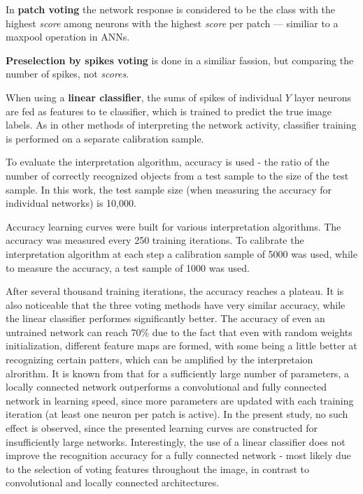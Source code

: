 \documentclass[a4paper]{article}
\begin{document}
In \textbf{patch voting} the network response is considered to be the class with the highest \textit{score} among neurons with the highest \textit{score} per patch --- similiar to a maxpool operation in ANNs.

\textbf{Preselection by spikes voting} is done in a similiar fassion, but comparing the number of spikes, not \textit{scores}.

When using a \textbf{linear classifier}, the sums of spikes of individual  $ Y $ layer neurons are fed as features to te classifier, which is trained to predict the true image labels. As in other methods of interpreting the network activity, classifier training is performed on a separate calibration sample.

To evaluate the interpretation algorithm, accuracy is used - the ratio of the number of correctly recognized objects from a test sample to the size of the test sample. In this work, the test sample size (when measuring the accuracy for individual networks) is 10,000.

Accuracy learning curves were built for various interpretation algorithms. The accuracy was measured every 250 training iterations. To calibrate the interpretation algorithm at each step a calibration sample of 5000 was used, while to measure the accuracy, a test sample of 1000 was used.

After several thousand training iterations, the accuracy reaches a plateau. It is also noticeable that the three voting methods have very similar accuracy, while the linear classifier performes significantly better. The accuracy of even an untrained network can reach 70\% due to the fact that even with random weights initialization, different feature maps are formed, with some being a little better at recognizing certain patters, which can be amplified by the interpretaion alrorithm. It is known from \cite{saunders2019locally} that for a sufficiently large number of parameters, a locally connected network outperforms a convolutional and fully connected network in learning speed, since more parameters are updated with each training iteration (at least one neuron per patch is active). In the present study, no such effect is observed, since the presented learning curves are constructed for insufficiently large networks. Interestingly, the use of a linear classifier does not improve the recognition accuracy for a fully connected network - most likely due to the selection of voting features throughout the image, in contrast to convolutional and locally connected architectures.
\end{document}
